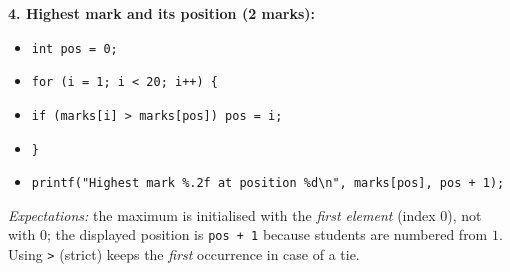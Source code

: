\documentclass[11pt]{article}
\begin{document}
\begin{corrige}
\textbf{4. Highest mark and its position (2 marks):}
\begin{itemize}
\item \texttt{int pos = 0;}
\item \texttt{for (i = 1; i < 20; i++) \{}
\item \texttt{\quad if (marks[i] > marks[pos]) pos = i;}
\item \texttt{\}}
\item \texttt{printf("Highest mark \%.2f at position \%d\textbackslash n", marks[pos], pos + 1);}
\end{itemize}
\emph{Expectations:} the maximum is initialised with the \emph{first element} (index $0$), not with $0$; the displayed position is \texttt{pos + 1} because students are numbered from $1$. Using \texttt{>} (strict) keeps the \emph{first} occurrence in case of a tie.
\end{corrige}
\end{document}
